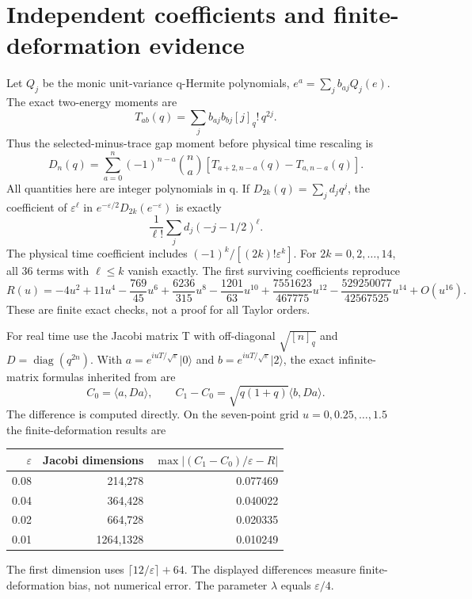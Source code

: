 \documentclass[11pt]{article}
\begin{document}
\newpage
\section{Independent coefficients and finite-deformation evidence}
Let $Q_j$ be the monic unit-variance q-Hermite polynomials,
$e^a=\sum_jb_{aj}Q_j(e)$. The exact two-energy moments are
\[
 T_{ab}(q)=\sum_jb_{aj}b_{bj}[j]_q!\,q^{2j}.
\]
Thus the selected-minus-trace gap moment before physical time
rescaling is
\[
 D_n(q)=\sum_{a=0}^n(-1)^{n-a}\binom na
                 [T_{a+2,n-a}(q)-T_{a,n-a}(q)].
\]
All quantities here are integer polynomials in q. If
$D_{2k}(q)=\sum_jd_jq^j$, the coefficient of $\varepsilon^\ell$
in $e^{-\varepsilon/2}D_{2k}(e^{-\varepsilon})$ is exactly
\[
 \frac1{\ell!}\sum_jd_j(-j-1/2)^\ell.
\]
The physical time coefficient includes
$(-1)^k/[(2k)!\varepsilon^k]$.
For $2k=0,2,\ldots,14$, all 36 terms with $\ell\le k$ vanish
exactly. The first surviving coefficients reproduce
\[
 R(u)=-4u^2+11u^4-\frac{769}{45}u^6+
 \frac{6236}{315}u^8-\frac{1201}{63}u^{10}
 +\frac{7551623}{467775}u^{12}
 -\frac{529250077}{42567525}u^{14}+O(u^{16}).
\]
These are finite exact checks, not a proof for all Taylor orders.

For real time use the Jacobi matrix T with off-diagonal
$\sqrt{[n]_q}$ and $D=\operatorname{diag}(q^{2n})$.
With $a=e^{iuT/\sqrt\varepsilon}|0\rangle$ and
$b=e^{iuT/\sqrt\varepsilon}|2\rangle$, the exact infinite-matrix
formulas inherited from \cite{selected} are
\[
 C_0=\langle a,Da\rangle,\qquad
 C_1-C_0=\sqrt{q(1+q)}\langle b,Da\rangle.
\]
The difference is computed directly. On the seven-point grid
$u=0,0.25,\ldots,1.5$ the finite-deformation results are
\begin{center}\begin{tabular}{rrr}\toprule
$\varepsilon$ & Jacobi dimensions & $\max| (C_1-C_0)/\varepsilon-R|$\\\midrule
0.08 & 214,278 & 0.077469\\
0.04 & 364,428 & 0.040022\\
0.02 & 664,728 & 0.020335\\
0.01 & 1264,1328 & 0.010249\\\bottomrule
\end{tabular}\end{center}
The first dimension uses $\lceil12/\varepsilon\rceil+64$.
The displayed differences measure finite-deformation bias, not
numerical error. The parameter $\lambda$ equals $\varepsilon/4$.

\newpage
\end{document}
